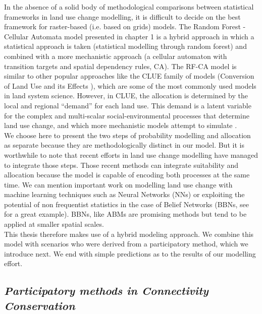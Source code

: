 \documentclass[12pt,Bold,TexShade]{thesis/mcgilletdclass}
\begin{document}
{In the absence of a solid body of methodological comparisons between statistical frameworks in land use change modelling, it is difficult to decide on the best framework for raster-based (i.e. based on grids) models. The Random Forest - Cellular Automata model presented in chapter 1 is a  hybrid approach in which a statistical approach is taken (statistical modelling through random forest) and combined with a more mechanistic approach (a cellular automaton with transition targets and spatial dependency rules, CA). The RF-CA model is similar to other popular approaches like the CLUE family of models (Conversion of Land Use and its Effects \cite{verburg_modeling_2002, verburg_combining_2009}), which are some of the most commonly used models in land system science. However, in CLUE, the allocation is determined by the local and regional “demand” for each land use. This demand is a latent variable for the complex and multi-scalar social-environmental processes that determine land use change, and which more mechanistic models attempt to simulate \citep{verburg_combining_2009}. \\

We choose here to present the two steps of probability modelling and allocation as separate because they are methodologically distinct in our model. But it is worthwhile to note that recent efforts in land use change modelling have managed to integrate those steps. Those recent methods can integrate suitability and allocation because the model is capable of encoding both processes at the same time. We can mention important work on modelling land use change with machine learning techniques such as Neural Networks (NNs) \citep{tayyebi_simulating_2013} or exploiting the potential of non frequentist statistics in the case of Belief Networks (BBNs, see \cite{celio_modeling_2014} for a great example). BBNs, like ABMs are promising methods but tend to be applied at smaller spatial scales. \\

This thesis therefore makes use of a hybrid modeling approach. We combine this model with scenarios who were derived from a participatory method, which we introduce next. We end with simple predictions as to the results of our modelling effort. \\ \vspace{2em}

\subsection*{\textit{Participatory methods in Connectivity Conservation \\ \vspace{1em}}}

}
\end{document}
